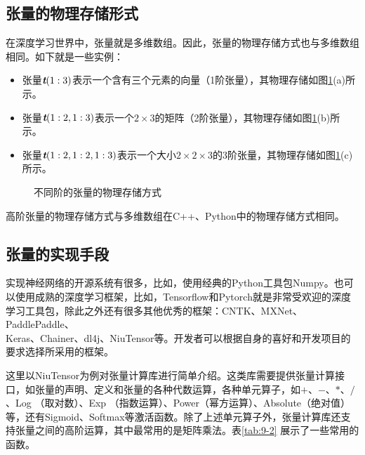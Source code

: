 \subsection{张量的物理存储形式}

\parinterval 在深度学习世界中，张量就是多维数组。因此，张量的物理存储方式也与多维数组相同。如下就是一些实例：

\begin{itemize}
\vspace{0.5em}
\item 张量$ {\textbf{\em t}}(1:3) $表示一个含有三个元素的向量（1阶张量），其物理存储如图\ref{fig:9-29}(a)所示。
\vspace{0.5em}
\item 张量$ {\textbf{\em t}}(1:2,1:3) $表示一个$ 2\times 3 $的矩阵（2阶张量），其物理存储如图\ref{fig:9-29}(b)所示。
\vspace{0.5em}
\item 张量${\textbf{\em t}}(1:2,1:2,1:3) $表示一个大小$ 2\times 2\times 3 $的3阶张量，其物理存储如图\ref{fig:9-29}(c)所示。
\vspace{0.5em}
\end{itemize}

\begin{figure}[htp]
\centering

\caption{不同阶的张量的物理存储方式}
\label{fig:9-29}
\end{figure}

\parinterval 高阶张量的物理存储方式与多维数组在C++、Python中的物理存储方式相同。


\subsection{张量的实现手段}

\parinterval 实现神经网络的开源系统有很多，比如，使用经典的Python工具包Numpy。也可以使用成熟的深度学习框架，比如，Tensorflow和Pytorch就是非常受欢迎的深度学习工具包，除此之外还有很多其他优秀的框架：CNTK、MXNet、PaddlePaddle、\\Keras、Chainer、dl4j、NiuTensor等。开发者可以根据自身的喜好和开发项目的要求选择所采用的框架。

\parinterval 这里以NiuTensor为例对张量计算库进行简单介绍。这类库需要提供张量计算接口，如张量的声明、定义和张量的各种代数运算，各种单元算子，如$ + $、$ - $、$ \ast $、$ / $、Log （取对数）、Exp （指数运算）、Power（幂方运算）、Absolute（绝对值）等，还有Sigmoid、Softmax等激活函数。除了上述单元算子外，张量计算库还支持张量之间的高阶运算，其中最常用的是矩阵乘法。表\ref{tab:9-2} 展示了一些常用的函数。

